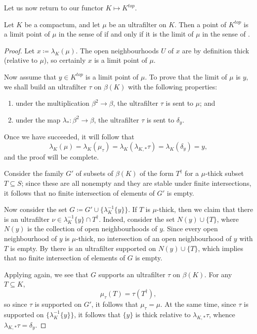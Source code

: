 Let us now return to our functor $ K \mapsto K^{\textit{top}} $.

\begin{lem} \label{limitsarelimits}
	Let $ K $ be a compactum, and let $ \mu $ be an ultrafilter on $ K $.
	Then a point of $ K^{\textit{top}} $ is a limit point of $ \mu $ in the sense of  if and only if it is the limit of $ \mu $ in the sense of .
\end{lem}

\begin{proof}
	Let $ x \coloneq \lambda_K(\mu) $.
	The open neighbourhoods $ U $ of $ x $ are by definition thick (relative to $ \mu $), so certainly $ x $ is a limit point of $ \mu $.

	Now assume that $ y \in K^{\textit{top}} $ is a limit point of $ \mu $.
	To prove that the limit of $ \mu $ is $ y $, we shall build an ultrafilter $ \tau $ on $ \beta(K) $ with the following properties:
	\begin{enumerate}[(1)]
		\item under the multiplication $ \beta^2 \to \beta $, the ultrafilter $ \tau $ is sent to $ \mu $; and
		\item under the map $ \lambda_{\ast} \colon \beta^2 \to \beta  $, the ultrafilter $ \tau $ is sent to $\delta_y$.
	\end{enumerate}
	Once we have succeeded, it will follow that
	\[
		\lambda_K( \mu ) = \lambda_K( \mu_{\tau} ) = \lambda_K(\lambda_{K,\ast}\tau) = \lambda_K(\delta_y) = y \comma
	\]
	and the proof will be complete.

	Consider the family $ G' $ of subsets of $ \beta(K) $ of the form $ T^{\dag} $ for a $ \mu $-thick subset $ T \subseteq S $;
	since these are all nonempty and they are stable under finite intersections, it follows that no finite intersection of elements of $ G' $ is empty.

	Now consider the set $ G \coloneq G' \cup \{ \lambda_K^{-1}\{y\} \}$.
	If $ T $ is $ \mu $-thick, then we claim that there is an ultrafilter $ \nu \in \lambda_K^{-1}\{y\} \cap T^{\dag} $.
	Indeed, consider the set $ N(y) \cup \{T\} $, where $ N(y) $ is the collection of open neighbourhoods of $ y $.
	Since every open neighbourhood of $ y $ is $ \mu $-thick, no intersection of an open neighbourhood of $ y $ with $ T $ is empty.
	By  there is an ultrafilter supported on $ N(y) \cup \{T\} $, which implies that no finite intersection of elements of $ G $ is empty.

	Applying  again, we see that $ G $ supports an ultrafilter $ \tau $ on $ \beta(K) $.
	For any $ T \subseteq K $,
	\[
		\mu_{\tau}(T) = \tau(T^{\dag}) \comma
	\]
	so since $ \tau $ is supported on $ G' $, it follows that $ \mu_{\tau} = \mu $.
	At the same time, since $ \tau $ is supported on $ \{\lambda_K^{-1}\{y\}\} $, it follows that $ \{y\} $ is thick relative to $ \lambda_{K,\ast}\tau $, whence $ \lambda_{K,\ast}\tau = \delta_y $.
\end{proof}

